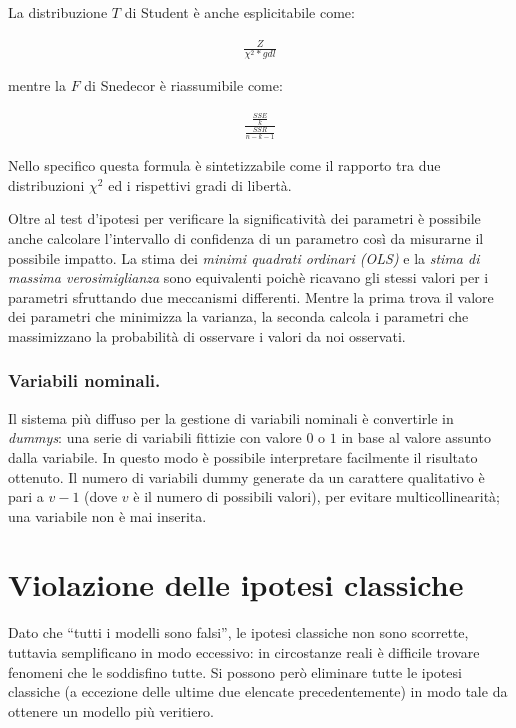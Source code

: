 \documentclass[11pt, twocolumn]{article}
\begin{document}
La distribuzione $T$ di Student è anche esplicitabile come:

\begin{align*}
\frac{Z}{\chi^2 * gdl}
\end{align*}

mentre la $F$ di Snedecor è riassumibile come:

\begin{align*}
\frac{\frac{SSE}{k}}{\frac{SSR}{n-k-1}}
\end{align*}

Nello specifico questa formula è sintetizzabile come il rapporto tra due distribuzioni $\chi^2$ ed i rispettivi gradi di libertà.

Oltre al test d'ipotesi per verificare la significatività dei parametri è possibile anche calcolare l'intervallo di confidenza di un parametro così da misurarne il possibile impatto.
\newline
\newline
La stima dei \textit{minimi quadrati ordinari (OLS)} e la \textit{stima di massima verosimiglianza} sono equivalenti poichè ricavano gli stessi valori per i parametri sfruttando due meccanismi differenti. Mentre la prima trova il valore dei parametri che minimizza la varianza, la seconda calcola i parametri che massimizzano la probabilità di osservare i valori da noi osservati. 

\section{Variabili nominali.}
Il sistema più diffuso per la gestione di variabili nominali è convertirle in \textit{dummys}: una serie di variabili fittizie con valore $0$ o $1$ in base al valore assunto dalla variabile.
In questo modo è possibile interpretare facilmente il risultato ottenuto.
Il numero di variabili dummy generate da un carattere qualitativo è pari a $v - 1$ (dove $v$ è il numero di possibili valori), per evitare multicollinearità; una variabile non è mai inserita.


\newpage
\part{Violazione delle ipotesi classiche}
Dato che ``tutti i modelli sono falsi'', le ipotesi classiche non sono scorrette, tuttavia semplificano in modo eccessivo: in circostanze reali è difficile trovare fenomeni che le soddisfino tutte.
Si possono però eliminare tutte le ipotesi classiche (a eccezione delle ultime due elencate precedentemente) in modo tale da ottenere un modello più veritiero.
\end{document}
